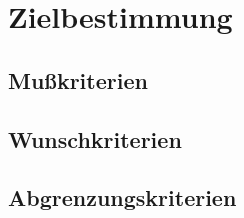 \chapter{Zielbestimmung}
\section{Mußkriterien}
\section{Wunschkriterien}
\section{Abgrenzungskriterien}
